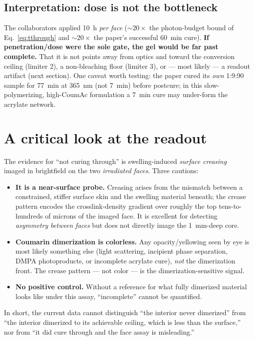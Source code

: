 \documentclass[11pt]{article}
\begin{document}
\subsection{Interpretation: dose is not the bottleneck}
The collaborators applied \SI{10}{h} \emph{per face} ($\sim\!20\times$ the photon-budget
bound of Eq.~\eqref{eq:tthrough} and $\sim\!20\times$ the paper's successful \SI{60}{min}
cure). \textbf{If penetration/dose were the sole gate, the gel would be far past complete.}
That it is not points away from optics and toward the conversion ceiling
(limiter 2), a non-bleaching floor (limiter 3), or --- most likely --- a readout artifact
(next section). One caveat worth testing: the paper cured its \emph{own} 1:9:90 sample for
\SI{77}{min} at \SI{365}{nm} (not \SI{7}{min}) before postcure; in this slow-polymerizing,
high-CoumAc formulation a \SI{7}{min} cure may under-form the acrylate network.

\section{A critical look at the readout}\label{sec:readout}

The evidence for ``not curing through'' is swelling-induced \emph{surface creasing} imaged
in brightfield on the two \emph{irradiated faces}. Three cautions:
\begin{itemize}[leftmargin=*]
  \item \textbf{It is a near-surface probe.} Creasing arises from the mismatch between a
  constrained, stiffer surface skin and the swelling material beneath; the crease pattern
  encodes the crosslink-density gradient over roughly the top tens-to-hundreds of microns of
  the imaged face. It is excellent for detecting \emph{asymmetry between faces} but does not
  directly image the \SI{1}{mm}-deep core.
  \item \textbf{Coumarin dimerization is colorless.} Any opacity/yellowing seen by eye is
  most likely something else (light scattering, incipient phase separation, DMPA
  photoproducts, or incomplete acrylate cure), \emph{not} the dimerization front. The
  crease pattern --- not color --- is the dimerization-sensitive signal.
  \item \textbf{No positive control.} Without a reference for what fully dimerized material
  looks like under this assay, ``incomplete'' cannot be quantified.
\end{itemize}
In short, the current data cannot distinguish ``the interior never dimerized'' from ``the
interior dimerized to its achievable ceiling, which is less than the surface,'' nor from
``it did cure through and the face assay is misleading.''
\end{document}
